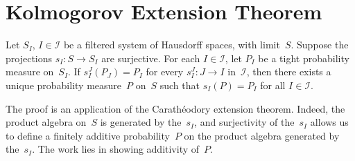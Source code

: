 \chapter	{Kolmogorov Extension Theorem}

\begin	{theorem}	
Let $S_I$, \( I \in \mathcal I \) be a filtered system of Hausdorff spaces,
with limit~$S$.
Suppose the projections \( s_I \colon S \to S_I \) are surjective.
For each \( I \in \mathcal I \), let $P_I$ be a tight probability measure
on~$S_I$.
If \( s_I^J(P_J) = P_I \) for every \( s_I^J \colon J \to I \) in~$\mathcal I$,
then there exists a unique probability measure~$P$ on~$S$ such that
\( s_I(P) = P_I \) for all \( I \in \mathcal I \).
\end	{theorem}
The proof is an application of the Carathéodory extension theorem.
Indeed, the product \sig algebra on~$S$ is generated by the~$s_I$,
and surjectivity of the~$s_I$ allows us to define a finitely additive
probability~$P$ on the product algebra generated by the~$s_I$.
The work lies in showing \sig additivity of~$P$.
